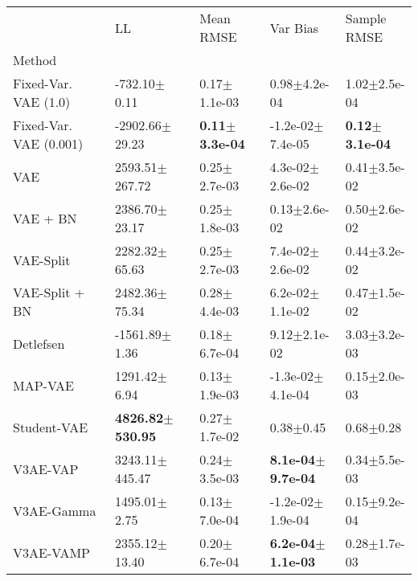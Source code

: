 \begin{tabular}{lllll}
\toprule
{} &                           LL &                  Mean RMSE &                      Var Bias &                Sample RMSE \\
Method                 &                              &                            &                               &                            \\
\midrule
Fixed-Var. VAE (1.0)   &             -732.10$\pm$0.11 &           0.17$\pm$1.1e-03 &              0.98$\pm$4.2e-04 &           1.02$\pm$2.5e-04 \\
Fixed-Var. VAE (0.001) &           -2902.66$\pm$29.23 &  \textbf{0.11$\pm$3.3e-04} &          -1.2e-02$\pm$7.4e-05 &  \textbf{0.12$\pm$3.1e-04} \\
VAE                    &           2593.51$\pm$267.72 &           0.25$\pm$2.7e-03 &           4.3e-02$\pm$2.6e-02 &           0.41$\pm$3.5e-02 \\
VAE + BN               &            2386.70$\pm$23.17 &           0.25$\pm$1.8e-03 &              0.13$\pm$2.6e-02 &           0.50$\pm$2.6e-02 \\
VAE-Split              &            2282.32$\pm$65.63 &           0.25$\pm$2.7e-03 &           7.4e-02$\pm$2.6e-02 &           0.44$\pm$3.2e-02 \\
VAE-Split + BN         &            2482.36$\pm$75.34 &           0.28$\pm$4.4e-03 &           6.2e-02$\pm$1.1e-02 &           0.47$\pm$1.5e-02 \\
Detlefsen              &            -1561.89$\pm$1.36 &           0.18$\pm$6.7e-04 &              9.12$\pm$2.1e-02 &           3.03$\pm$3.2e-03 \\
MAP-VAE                &             1291.42$\pm$6.94 &           0.13$\pm$1.9e-03 &          -1.3e-02$\pm$4.1e-04 &           0.15$\pm$2.0e-03 \\
Student-VAE            &  \textbf{4826.82$\pm$530.95} &           0.27$\pm$1.7e-02 &                 0.38$\pm$0.45 &              0.68$\pm$0.28 \\
V3AE-VAP               &           3243.11$\pm$445.47 &           0.24$\pm$3.5e-03 &  \textbf{8.1e-04$\pm$9.7e-04} &           0.34$\pm$5.5e-03 \\
V3AE-Gamma             &             1495.01$\pm$2.75 &           0.13$\pm$7.0e-04 &          -1.2e-02$\pm$1.9e-04 &           0.15$\pm$9.2e-04 \\
V3AE-VAMP              &            2355.12$\pm$13.40 &           0.20$\pm$6.7e-04 &  \textbf{6.2e-04$\pm$1.1e-03} &           0.28$\pm$1.7e-03 \\

\end{tabular}
